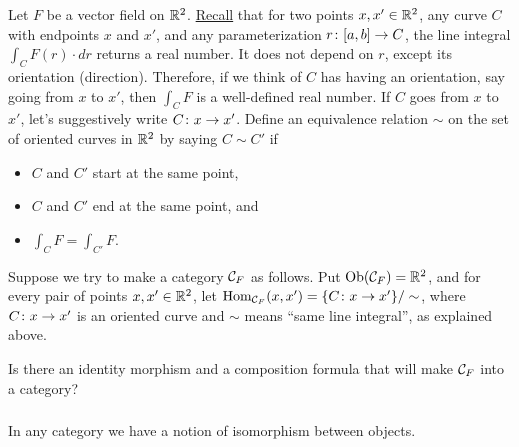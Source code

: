 \documentclass[CT4S-EN-RU]{subfiles}
\begin{document}
\begin{remarkRUS}
\end{remarkRUS}

\begin{exerciseENG}\label{exc:vector field 1}
Let $F$ be a vector field on ${\mathbb R}^2$. \href{http://en.wikipedia.org/wiki/Line_integral#Line_integral_of_a_vector_field}{Recall} that for two points $x,x'\in{\mathbb R}^2$, any curve $C$ with endpoints $x$ and $x'$, and any parameterization $r\colon [a,b]\rightarrow C$, the line integral $\int_CF(r)\cdot dr$ returns a real number. It does not depend on $r$, except its orientation (direction). Therefore, if we think of $C$ has having an orientation, say going from $x$ to $x'$, then $\int_CF$ is a well-defined real number. If $C$ goes from $x$ to $x'$, let's suggestively write $C\colon x\rightarrow x'$. Define an equivalence relation $\sim$ on the set of oriented curves in ${\mathbb R}^2$ by saying $C\sim C'$ if
\begin{itemize}
\item $C$ and $C'$ start at the same point,
\item $C$ and $C'$ end at the same point, and
\item $\int_CF=\int_{C'}F$.
\end{itemize}

Suppose we try to make a category $\mathcal{C}_F$ as follows. Put $\textnormal{Ob}(\mathcal{C}_F)={\mathbb R}^2$, and for every pair of points $x,x'\in{\mathbb R}^2$, let $\textnormal{Hom}_{\mathcal{C}_F}(x,x')=\{C\colon x\rightarrow x'\}/\sim$, where $C\colon x\rightarrow x'$ is an oriented curve and $\sim$ means “same line integral”, as explained above. 

Is there an identity morphism and a composition formula that will make $\mathcal{C}_F$ into a category? 
\end{exerciseENG}

\begin{exerciseRUS}\label{exc:vector field 1}
\end{exerciseRUS}


\subsubsection{}

\begin{blockENG}
In any category we have a notion of isomorphism between objects.
\end{blockENG}
\end{document}

